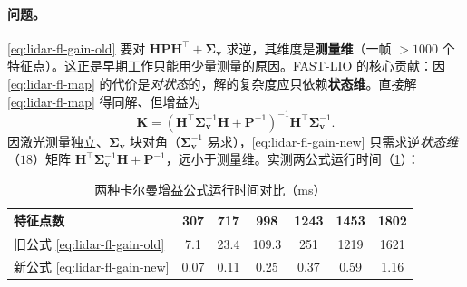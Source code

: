 \paragraph{问题。}
\cref{eq:lidar-fl-gain-old} 要对 $\mathbf{H}\mathbf{P}\mathbf{H}^\top+\boldsymbol{\Sigma}_{\mathbf{v}}$ 求逆，其维度是\textbf{测量维}（一帧 $>1000$ 个特征点）。这正是早期工作只能用少量测量的原因。FAST-LIO 的核心贡献\cite{xu2021fastlio}：因 \cref{eq:lidar-fl-map} 的代价是\emph{对状态}的，解的复杂度应只依赖\textbf{状态维}。直接解 \cref{eq:lidar-fl-map} 得同解、但增益为
\begin{equation}
  \boxed{\ \mathbf{K}=(\mathbf{H}^\top\boldsymbol{\Sigma}_{\mathbf{v}}^{-1}\mathbf{H}+\mathbf{P}^{-1})^{-1}\mathbf{H}^\top\boldsymbol{\Sigma}_{\mathbf{v}}^{-1}.\ }
  \label{eq:lidar-fl-gain-new}
\end{equation}
因激光测量独立、$\boldsymbol{\Sigma}_{\mathbf{v}}$ 块对角（$\boldsymbol{\Sigma}_{\mathbf{v}}^{-1}$ 易求），\cref{eq:lidar-fl-gain-new} 只需求逆\emph{状态维}（$18$）矩阵 $\mathbf{H}^\top\boldsymbol{\Sigma}_{\mathbf{v}}^{-1}\mathbf{H}+\mathbf{P}^{-1}$，远小于测量维。实测两公式运行时间（\cref{tab:lidar-gain}）：

\begin{table}[H]\centering\small
\caption{两种卡尔曼增益公式运行时间对比（ms）\cite{xu2021fastlio}}
\label{tab:lidar-gain}
\begin{tabular}{lcccccc}
\toprule
特征点数 & 307 & 717 & 998 & 1243 & 1453 & 1802 \\
\midrule
旧公式 \cref{eq:lidar-fl-gain-old} & 7.1 & 23.4 & 109.3 & 251 & 1219 & 1621 \\
新公式 \cref{eq:lidar-fl-gain-new} & 0.07 & 0.11 & 0.25 & 0.37 & 0.59 & 1.16 \\
\bottomrule
\end{tabular}
\end{table}

